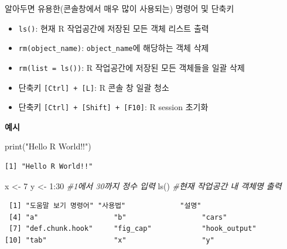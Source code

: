 \documentclass[
  11pt,
]{krantz}
\makeatletter
\newenvironment{Shaded}{\begin{snugshade}}{\end{snugshade}}
\newcommand{\CommentTok}[1]{\textcolor[rgb]{0.37,0.37,0.37}{\textit{#1}}}
\newcommand{\DecValTok}[1]{\textcolor[rgb]{0.06,0.06,0.06}{#1}}
\newcommand{\FunctionTok}[1]{\textcolor[rgb]{0,0,0}{#1}}
\newcommand{\NormalTok}[1]{#1}
\newcommand{\OtherTok}[1]{\textcolor[rgb]{0.37,0.37,0.37}{#1}}
\newcommand{\SpecialCharTok}[1]{\textcolor[rgb]{0,0,0}{#1}}
\newcommand{\StringTok}[1]{\textcolor[rgb]{0.5,0.5,0.5}{#1}}
\providecommand{\tightlist}{%
  \setlength{\itemsep}{0pt}\setlength{\parskip}{0pt}}
\newenvironment{kframe}{%
\medskip{}
\setlength{\fboxsep}{.8em}
 \def\at@end@of@kframe{}%
 \ifinner\ifhmode%
  \def\at@end@of@kframe{\end{minipage}}%
  \begin{minipage}{\columnwidth}%
 \fi\fi%
 \def\FrameCommand##1{\hskip\@totalleftmargin \hskip-\fboxsep
 \colorbox{shadecolor}{##1}\hskip-\fboxsep
     \hskip-\linewidth \hskip-\@totalleftmargin \hskip\columnwidth}%
 \MakeFramed {\advance\hsize-\width
   \@totalleftmargin\z@ \linewidth\hsize
   \@setminipage}}%
 {\par\unskip\endMakeFramed%
 \at@end@of@kframe}
\newenvironment{rmdblock}[1]
  {
  \begin{itemize}
  \renewcommand{\labelitemi}{
    \raisebox{-.7\height}[0pt][0pt]{
      {\setkeys{Gin}{width=3em,keepaspectratio}\texttt{[image: images/\#1]}}
    }
  }
  \setlength{\fboxsep}{1em}
  \begin{kframe}
  \item
  }
  {
  \end{kframe}
  \end{itemize}
  }
\newenvironment{rmdtip}
  {\begin{rmdblock}{tip}}
  {\end{rmdblock}}
\makeatother
\begin{document}
\footnotesize

\begin{rmdtip}
알아두면 유용한(콘솔창에서 매우 많이 사용되는) 명령어 및 단축키

\begin{itemize}
\tightlist
\item
  \texttt{ls()}: 현재 R 작업공간에 저장된 모든 객체 리스트 출력
\item
  \texttt{rm(object\_name)}: \texttt{object\_name}에 해당하는 객체 삭제
\item
  \texttt{rm(list\ =\ ls())}: R 작업공간에 저장된 모든 객체들을 일괄 삭제
\item
  단축키 \texttt{{[}Ctrl{]}\ +\ {[}L{]}}: R 콘솔 창 일괄 청소
\item
  단축키 \texttt{{[}Ctrl{]}\ +\ {[}Shift{]}\ +\ {[}F10{]}}: R session 초기화
\end{itemize}

\textbf{예시}
\end{rmdtip}

\normalsize

\footnotesize

\begin{Shaded}
\begin{Highlighting}[]
\FunctionTok{print}\NormalTok{(}\StringTok{"Hello R World!!"}\NormalTok{)}
\end{Highlighting}
\end{Shaded}

\begin{verbatim}
[1] "Hello R World!!"
\end{verbatim}

\begin{Shaded}
\begin{Highlighting}[]
\NormalTok{x }\OtherTok{\textless{}{-}} \DecValTok{7}
\NormalTok{y }\OtherTok{\textless{}{-}} \DecValTok{1}\SpecialCharTok{:}\DecValTok{30} \CommentTok{\#1에서 30까지 정수 입력}
\FunctionTok{ls}\NormalTok{() }\CommentTok{\#현재 작업공간 내 객체명 출력}
\end{Highlighting}
\end{Shaded}

\begin{verbatim}
 [1] "도움말 보기 명령어" "사용법"             "설명"              
 [4] "a"                  "b"                  "cars"              
 [7] "def.chunk.hook"     "fig_cap"            "hook_output"       
[10] "tab"                "x"                  "y"                 
\end{verbatim}
\end{document}
